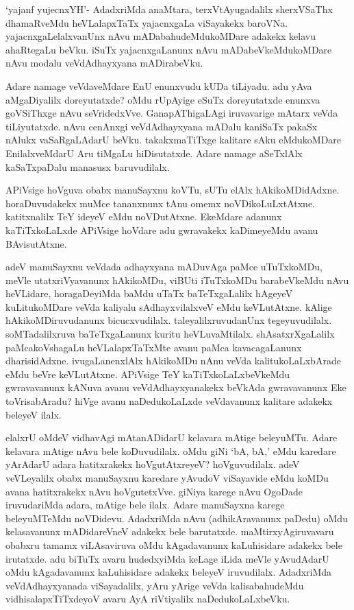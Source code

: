 `yajanf yujecnxYH'- AdadxriMda anaMtara, terxVtAyugadalilx sherxVSaThx dhamaRveMdu heVLalapxTaTx yajacnxgaLa viSayakekx baroVNa. yajacnxgaLelalxvanUnx nAvu mADabahudeMdukoMDare adakekx kelavu ahaRtegaLu beVku. iSuTx yajacnxgaLanunx nAvu mADabeVkeMdukoMDare nAvu modalu veVdAdhayxyana mADirabeVku.

Adare namage veVdaveMdare EnU enunxvudu kUDa tiLiyadu. adu yAva aMgaDiyalilx doreyutatxde? oMdu rUpAyige eSuTx doreyutatxde enunxva goVSiThxge nAvu seVridedxVve. GanapAThigaLAgi iruvavarige mAtarx veVda tiLiyutatxde. nAvu cenAnxgi veVdAdhayxyana mADalu kaniSaTx pakaSx nAlukx vaSaRgaLAdarU beVku. takakxmaTiTxge kalitare sAku eMdukoMDare EnilalxveMdarU Aru tiMgaLu hiDisutatxde. Adare namage aSeTxlAlx kaSaTxpaDalu manasusx baruvudilalx.

APiVsige hoVguva obabx manuSayxnu koVTu, sUTu elAlx hAkikoMDidAdxne. horaDuvudakekx muMce tananxnunx tAnu omemx noVDikoLuLxtAtxne. katitxnalilx TeY ideyeV eMdu noVDutAtxne. EkeMdare adanunx kaTiTxkoLaLxde APiVsige hoVdare adu gwravakekx kaDimeyeMdu avanu BAvisutAtxne.

adeV manuSayxnu veVdada adhayxyana mADuvAga paMce uTuTxkoMDu, meVle utatxriVyavanunx hAkikoMDu, viBUti iTuTxkoMDu barabeVkeMdu nAvu heVLidare, horagaDeyiMda baMdu uTaTx baTeTxgaLalilx hAgeyeV kuLitukoMDare veVda kaliyalu sAdhayxvilalxveV eMdu keVLutAtxne. kAlige hAkikoMDiruvudanunx bicucxvudilalx. taleyalilxruvudanUnx tegeyuvudilalx. soMTadalilxruva baTeTxgaLanunx kuritu heVLuvaMtilalx. shAsatxrXgaLalilx paMcakoVshagaLu heVLalapxTaTxMte avanu paMca kavacagaLanunx dharisidAdxne. ivugaLanenxlAlx hAkikoMDu nAnu veVda kalitukoLaLxbArade eMdu beVre keVLutAtxne. APiVsige TeY kaTiTxkoLaLxbeVkeMdu gwravavanunx kANuva avanu veVdAdhayxyanakekx beVkAda gwravavanunx Eke toVrisabAradu? hiVge avanu naDedukoLaLxde veVdavanunx kalitare adakekx beleyeV ilalx.

elalxrU oMdeV vidhavAgi mAtanADidarU kelavara mAtige beleyuMTu. Adare kelavara mAtige nAvu bele koDuvudilalx. oMdu giNi `bA, bA,' eMdu karedare yArAdarU adara hatitxrakekx hoVgutAtxreyeV? hoVguvudilalx. adeV veVLeyalilx obabx manuSayxnu karedare yAvudoV viSayavide eMdu koMDu avana hatitxrakekx nAvu hoVgutetxVve. giNiya karege nAvu OgoDade iruvudariMda adara, mAtige bele ilalx. Adare manuSayxna karege beleyuMTeMdu noVDidevu. AdadxriMda nAvu (adhikAravanunx paDedu) oMdu kelasavanunx mADidareVneV adakekx bele barutatxde. maMtirxyAgiruvavaru obabxru tamamx viLAsaviruva oMdu kAgadavanunx kaLuhisidare adakekx bele irutatxde. adu biTuTx avaru hudedxyiMda keLage iLida meVle yAvudAdarU oMdu kAgadavanunx kaLuhisidare adakekx beleyeV iruvudilalx. AdadxriMda veVdAdhayxyanada viSayadalilx, yAru yArige veVda kalisabahudeMdu vidhisalapxTiTxdeyoV avaru AyA riVtiyalilx naDedukoLaLxbeVku.

